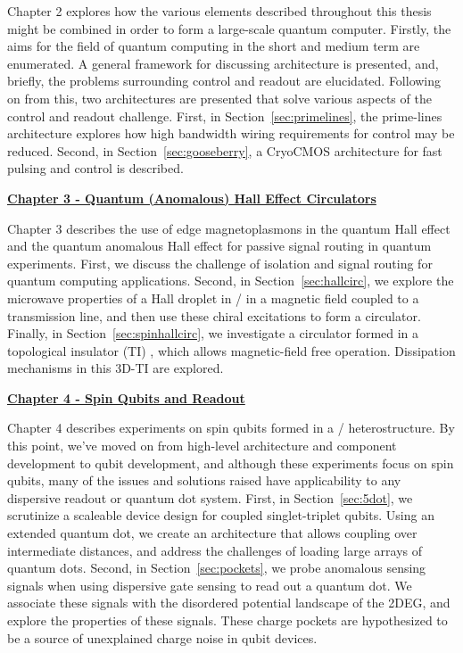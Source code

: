 \noindent
Chapter 2 explores how the various elements described throughout this thesis might be combined in order to form
a large-scale quantum computer. Firstly, the aims for the field of quantum computing in the short and medium term are
enumerated. A general framework for discussing architecture is presented, and, briefly, the problems surrounding control
and readout are elucidated. Following on from this, two architectures are presented that solve various aspects of the control
and readout challenge. First, in Section~\ref{sec:primelines}, the prime-lines architecture explores how high bandwidth
wiring requirements for control may be reduced. Second, in Section~\ref{sec:gooseberry}, a CryoCMOS architecture for fast
pulsing and control is described.

\medskip
\noindent\textbf{\hyperref[sec:hall]{Chapter 3 - Quantum (Anomalous) Hall Effect Circulators}}

\noindent
Chapter 3 describes the use of edge magnetoplasmons in the quantum Hall effect and the quantum anomalous Hall effect
for passive signal routing in quantum experiments. First, we discuss the challenge of isolation and signal routing
for quantum computing applications. Second, in Section~\ref{sec:hallcirc}, we explore the microwave properties of a
Hall droplet in / in a magnetic field coupled to a transmission line, and then use these chiral
excitations to form a circulator. Finally, in Section~\ref{sec:spinhallcirc}, we investigate a circulator formed in a topological
insulator (TI) , which allows magnetic-field free operation. Dissipation mechanisms in this 3D-TI
are explored.

\medskip
\noindent\textbf{\hyperref[sec:spinqubit]{Chapter 4 - Spin Qubits and Readout}}

\noindent
Chapter 4 describes experiments on spin qubits formed in a / heterostructure. By this point, we've moved
on from high-level architecture and component development to qubit development, and although these experiments focus on
spin qubits, many of the issues and solutions raised have applicability to any dispersive readout or quantum dot system.
First, in Section~\ref{sec:5dot}, we scrutinize a scaleable device design for coupled singlet-triplet qubits. Using an
extended quantum dot, we create an architecture that allows coupling over intermediate distances, and address the challenges
of loading large arrays of quantum dots. Second, in Section~\ref{sec:pockets}, we probe anomalous sensing signals when
using dispersive gate sensing to read out a quantum dot. We associate these signals with the disordered potential landscape
of the 2DEG, and explore the properties of these signals. These charge pockets are hypothesized to be a source of unexplained
charge noise in qubit devices.

